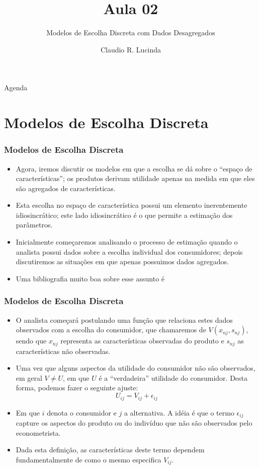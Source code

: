 \documentclass{beamer}
\title{Aula 02}
\subtitle{Modelos de Escolha Discreta com Dados Desagregados}
\author{Claudio R. Lucinda}
\institute{FEA-RP/USP}
\date{}
\begin{document}
\frame{\titlepage}
\begin{frame}{Agenda}
  \tableofcontents[pausesections]
\end{frame}


\section{Modelos de Escolha Discreta}

\begin{frame}\frametitle{Modelos de Escolha Discreta}


\begin{itemize}
\item Agora, iremos discutir os modelos em que a escolha se dá sobre o ``espaço
de características''; os produtos derivam utilidade apenas na medida
em que eles são agregados de características. 
\item Esta escolha no espaço de característica possui um elemento inerentemente
idiosincrático; este lado idiosincrático é o que permite a estimação
dos parâmetros.
\item Inicialmente começaremos analisando o processo de estimação quando
o analista possui dados sobre a escolha individual dos consumidores;
depois discutiremos as situações em que apenas possuimos dados agregados.
\item Uma bibliografia muito boa sobre esse assunto é 
\end{itemize}
\end{frame}

\begin{frame}\frametitle{Modelos de Escolha Discreta}


\begin{itemize}
\item O analista começará postulando uma função que relaciona estes dados
observados com a escolha do consumidor, que chamaremos de $V(x_{nj},s_{nj})$,
sendo que $x_{nj}$ representa as características observadas do produto
e $s_{nj}$ as características não observadas.
\item Uma vez que alguns aspectos da utilidade do consumidor não são observados,
em geral $V\neq U$, em que $U$ é a ``verdadeira'' utilidade do
consumidor. Desta forma, podemos fazer o seguinte ajuste:
\[
U_{ij}=V_{ij}+\epsilon_{ij}
\]
\item Em que $i$ denota o consumidor e $j$ a alternativa. A idéia é que
o termo $\epsilon_{ij}$ capture os aspectos do produto ou do indivíduo
que não são observados pelo econometrista. 
\item Dada esta definição, as características deste termo dependem fundamentalmente
de como o mesmo especifica $V_{ij}$. 
\end{itemize}
\end{frame}
\end{document}
